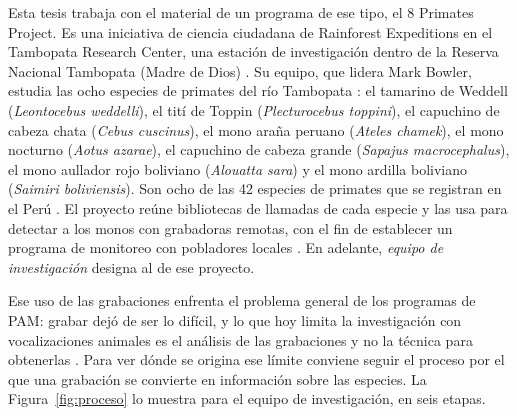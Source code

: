 Esta tesis trabaja con el material de un programa de ese tipo, el 8 Primates
Project. Es una iniciativa de ciencia ciudadana de Rainforest Expeditions en el
Tambopata Research Center, una estación de investigación dentro de la Reserva
Nacional Tambopata (Madre de Dios) \citep{rfe_trc}. Su equipo, que lidera Mark
Bowler, estudia las ocho especies de primates del río Tambopata
\citep{wiredamazon_8primates}: el tamarino de Weddell (\textit{Leontocebus
    weddelli}), el tití de Toppin (\textit{Plecturocebus toppini}), el capuchino de
cabeza chata (\textit{Cebus cuscinus}), el mono araña peruano (\textit{Ateles
    chamek}), el mono nocturno (\textit{Aotus azarae}), el capuchino de cabeza
grande (\textit{Sapajus macrocephalus}), el mono aullador rojo boliviano
(\textit{Alouatta sara}) y el mono ardilla boliviano (\textit{Saimiri
    boliviensis}). Son ocho de las 42 especies de primates que se registran en el
Perú \citep{pacheco_lista_2021}. El proyecto reúne bibliotecas de llamadas de cada
especie y las usa para detectar a los monos con grabadoras remotas, con el fin de
establecer un programa de monitoreo con pobladores locales
\citep{wiredamazon_8primates}. En adelante, \emph{equipo de investigación}
designa al de ese proyecto.

Ese uso de las grabaciones enfrenta el problema general de los programas de PAM:
grabar dejó de ser lo difícil, y lo que hoy limita la investigación con
vocalizaciones animales es el análisis de las grabaciones y no la técnica para
obtenerlas \citep{romero-mujalli_utilizing_2021}. Para ver dónde se origina ese
límite conviene seguir el proceso por el que una grabación se convierte en
información sobre las especies. La Figura~\ref{fig:proceso} lo muestra para el
equipo de investigación, en seis etapas.

